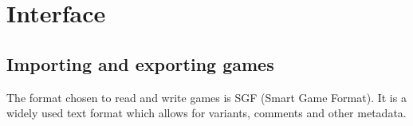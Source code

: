 \section{Interface}

\subsection{Importing and exporting games}

The format chosen to read and write games is SGF (Smart Game Format). It is a
widely used text format which allows for variants, comments and other metadata.
